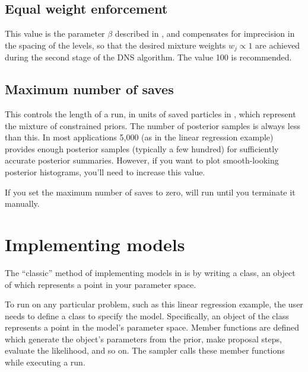 \documentclass[article]{jss}
\begin{document}
\subsection{Equal weight enforcement}
This value is the parameter $\beta$ described in
\citet{brewer2011diffusive}, and compensates
for imprecision in the spacing of the levels, so that the desired mixture
weights $w_j \propto 1$ are achieved during the second stage of the DNS
algorithm. The value 100 is recommended.

\subsection{Maximum number of saves}
This controls the length of a  run, in units of saved particles
in , which represent the mixture of constrained priors.
The number of posterior samples is always less than this. In most applications
5,000 (as in the linear regression example) provides enough posterior
samples (typically a few hundred) for sufficiently accurate posterior
summaries. However, if you want to plot smooth-looking posterior histograms,
you'll need to increase this value.

If you set the maximum number of saves to zero,  will run until
you terminate it manually.

\section{Implementing models}\label{sec:models}
The ``classic'' method of implementing models in  is by
writing a  class, an object of which represents a
point in your parameter space.

To run  on any particular problem, such as this linear regression
example, the user needs to define a  class to specify the
model. Specifically, an object of the class represents a point in the
model's parameter space. Member functions are defined which generate
the object's parameters from the prior, make proposal steps, evaluate the
likelihood, and so on. The sampler calls these member functions while
executing a run.
\end{document}

